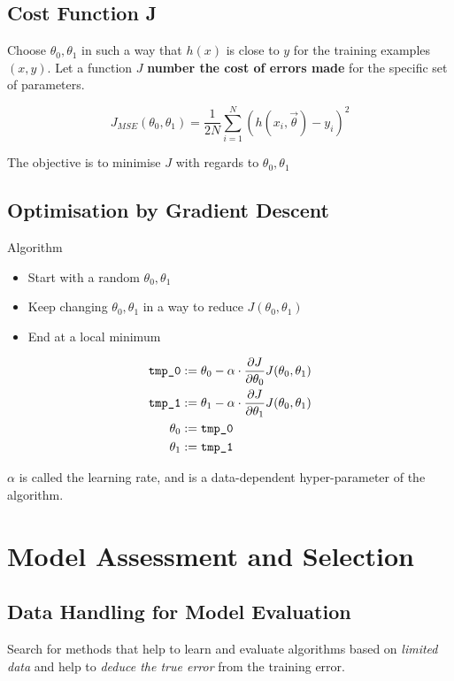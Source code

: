 \documentclass[11pt]{article}
\theoremstyle{definition}
\begin{document}
\subsection{Cost Function J}
Choose $\theta_0, \theta_1$ in such a way that $h(x)$ is close to $y$ for the training examples $(x,y)$. Let a function $J$ \textbf{number the cost of errors made} for the specific set of parameters.

\begin{equation*}
	J_{MSE}(\theta_0, \theta_1) = \frac{1}{2N} \sum_{i=1}^{N} \left(h(x_i, \vec{\theta}) - y_i\right)^2
\end{equation*}

The objective is to minimise $J$ with regards to $\theta_0, \theta_1$

\subsection{Optimisation by Gradient Descent}
Algorithm
\begin{itemize}
	\item Start with a random $\theta_0, \theta_1$
	\item Keep changing $\theta_0, \theta_1$ in a way to reduce $J(\theta_0, \theta_1)$
	\item End at a local minimum
\end{itemize}

\begin{align*}
	\text{\texttt{tmp\_0}} &:= \theta_0 - \alpha \cdot \frac{\partial J}{\partial \theta_0} J(\theta_0,\theta_1)\\
	\text{\texttt{tmp\_1}} &:= \theta_1 - \alpha \cdot \frac{\partial J}{\partial \theta_1} J(\theta_0,\theta_1)\\
	\theta_0 &:= \text{\texttt{tmp\_0}}\\
	\theta_1 &:= \text{\texttt{tmp\_1}}\\
\end{align*}

$\alpha$ is called the learning rate, and is a data-dependent hyper-parameter of the algorithm.

\section{Model Assessment and Selection}

\subsection{Data Handling for Model Evaluation}
Search for methods that help to learn and evaluate algorithms based on \emph{limited data} and help to \emph{deduce the true error} from the training error.
\end{document}
